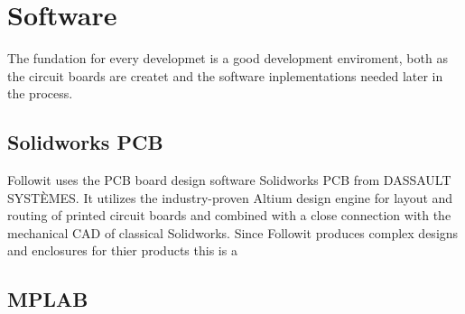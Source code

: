 \section{Software}
The fundation for every developmet is a good development enviroment, both as the circuit boards are createt and the software inplementations needed later in the process. 

\subsection{Solidworks PCB}
Followit uses the PCB board design software Solidworks PCB from DASSAULT SYSTÈMES. It utilizes the industry-proven Altium design engine for layout and routing of printed circuit boards and combined with a close connection with the mechanical CAD of classical Solidworks. Since Followit produces complex designs and enclosures for thier products this is a 

\subsection{MPLAB}

